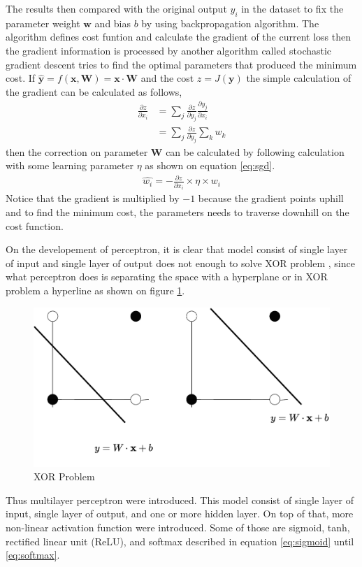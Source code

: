    The results then compared with the original output $y_i$ in the
    dataset to fix the parameter weight $\mathbf{w}$ and bias $b$ by
    using backpropagation algorithm. The algorithm defines cost
    funtion and calculate the gradient of the current loss then the
    gradient information is processed by another algorithm called
    stochastic gradient descent tries to find the optimal parameters
    that produced the minimum cost. If $\mathbf{\hat{y}} =
    f(\mathbf{x}, \mathbf{W}) = \mathbf{x} \cdot \mathbf{W}$ and the
    cost $z = J(\mathbf{y})$ the simple calculation of the gradient
    can be calculated as follows,
    \begin{align}
        \label{eq:gradient1}
        \frac{\partial z}{\partial x_i} &= \sum_j \frac{\partial z}{\partial y_j} \frac{\partial y_j}{\partial x_i}\\
        \label{eq:gradient2}        
        &= \sum_j \frac{\partial z}{\partial y_j} \sum_k w_k
    \end{align}
    then the correction on parameter $\mathbf{W}$ can be calculated by
    following calculation with some learning parameter $\eta$ as shown
    on equation \ref{eq:sgd}.
    \begin{align}
        \label{eq:sgd}
        \hat{w_i} = -\frac{\partial z}{\partial x_i} \times \eta \times w_i
    \end{align}
    Notice that the gradient is multiplied by $-1$ because the
    gradient points uphill and to find the minimum cost, the
    parameters needs to traverse downhill on the cost function.
    
    On the developement of perceptron, it is clear that model consist
    of single layer of input and single layer of output does not
    enough to solve XOR problem \citep{Goodfellow-et-al-2016}, since
    what perceptron does is separating the space with a hyperplane or
    in XOR problem a hyperline as shown on figure \ref{fig:xor}. 
    \begin{figure}
        \centering
        \includegraphics[width=.5\linewidth]{images/xor.pdf}
        \caption{XOR Problem}
        \label{fig:xor}
    \end{figure}
    Thus multilayer perceptron were
    introduced. This model consist of single layer of input, single
    layer of output, and one or more hidden layer. On top of that,
    more non-linear activation function were introduced. Some of those
    are sigmoid, tanh, rectified linear unit (ReLU), and softmax
    described in equation \ref{eq:sigmoid} until \ref{eq:softmax}.

